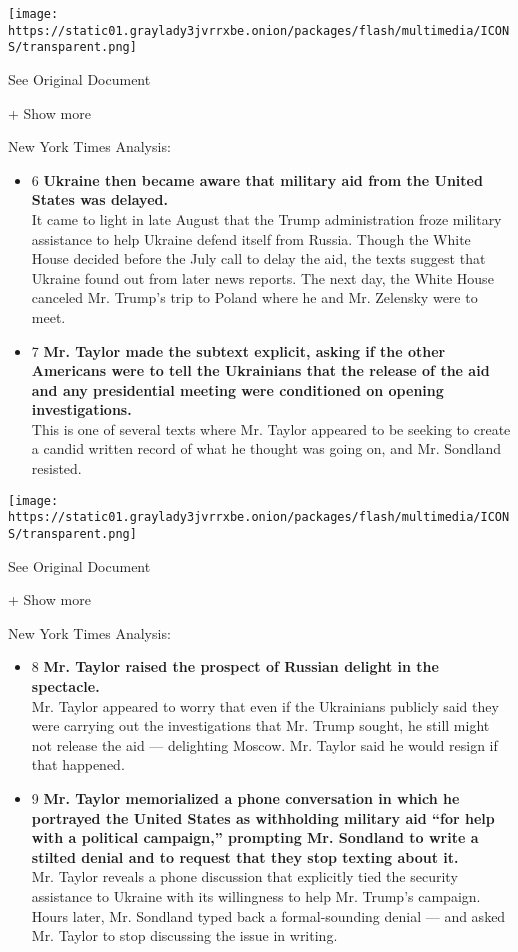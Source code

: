 \texttt{[image: https://static01.graylady3jvrrxbe.onion/packages/flash/multimedia/ICONS/transparent.png]}

See Original Document

+ Show more

New York Times Analysis:

\begin{itemize}
\tightlist
\item
  6 \textbf{Ukraine then became aware that military aid from the United
  States was delayed.}\\
  It came to light in late August that the Trump administration froze
  military assistance to help Ukraine defend itself from Russia. Though
  the White House decided before the July call to delay the aid, the
  texts suggest that Ukraine found out from later news reports. The next
  day, the White House canceled Mr. Trump's trip to Poland where he and
  Mr. Zelensky were to meet.
\item
  7 \textbf{Mr. Taylor made the subtext explicit, asking if the other
  Americans were to tell the Ukrainians that the release of the aid and
  any presidential meeting were conditioned on opening
  investigations.}\\
  This is one of several texts where Mr. Taylor appeared to be seeking
  to create a candid written record of what he thought was going on, and
  Mr. Sondland resisted.
\end{itemize}

\protect\hyperlink{}{}

\texttt{[image: https://static01.graylady3jvrrxbe.onion/packages/flash/multimedia/ICONS/transparent.png]}

See Original Document

+ Show more

New York Times Analysis:

\begin{itemize}
\tightlist
\item
  8 \textbf{Mr. Taylor raised the prospect of Russian delight in the
  spectacle.}\\
  Mr. Taylor appeared to worry that even if the Ukrainians publicly said
  they were carrying out the investigations that Mr. Trump sought, he
  still might not release the aid --- delighting Moscow. Mr. Taylor said
  he would resign if that happened.
\item
  9 \textbf{Mr. Taylor memorialized a phone conversation in which he
  portrayed the United States as withholding military aid ``for help
  with a political campaign,'' prompting Mr. Sondland to write a stilted
  denial and to request that they stop texting about it.}\\
  Mr. Taylor reveals a phone discussion that explicitly tied the
  security assistance to Ukraine with its willingness to help Mr.
  Trump's campaign. Hours later, Mr. Sondland typed back a
  formal-sounding denial --- and asked Mr. Taylor to stop discussing the
  issue in writing.
\end{itemize}

